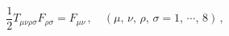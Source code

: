 \begin{equation}
 \frac{1}{2}T_{\mu\nu\rho\sigma}F_{\rho\sigma}=F_{\mu\nu}\,,
 \quad (\mu,\,\nu,\,\rho,\,\sigma =1,\,\cdots,\, 8)\,,\label{eq:2.1}
\end{equation}

